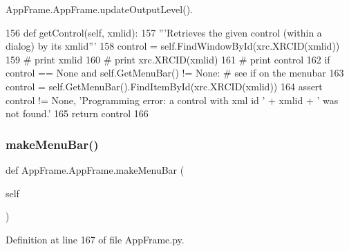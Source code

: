 App\+Frame.\+App\+Frame.\+update\+Output\+Level().


\begin{DoxyCode}
156     \textcolor{keyword}{def }getControl(self, xmlid):
157         \textcolor{stringliteral}{'''Retrieves the given control (within a dialog) by its xmlid'''}
158         control = self.FindWindowById(xrc.XRCID(xmlid))
159 \textcolor{comment}{#        print xmlid}
160 \textcolor{comment}{#        print xrc.XRCID(xmlid)}
161 \textcolor{comment}{#        print control}
162         \textcolor{keywordflow}{if} control == \textcolor{keywordtype}{None} \textcolor{keywordflow}{and} self.GetMenuBar() != \textcolor{keywordtype}{None}:  \textcolor{comment}{# see if on the menubar}
163             control = self.GetMenuBar().FindItemById(xrc.XRCID(xmlid))
164         \textcolor{keyword}{assert} control != \textcolor{keywordtype}{None}, \textcolor{stringliteral}{'Programming error: a control with xml id '} + xmlid + \textcolor{stringliteral}{' was not found.'}
165         \textcolor{keywordflow}{return} control
166     
\end{DoxyCode}
\mbox{\label{classAppFrame_1_1AppFrame_a39ad7daf6cc1af75dc9ac03aa19a055c}} 
\subsubsection{\texorpdfstring{make\+Menu\+Bar()}{makeMenuBar()}}
{\footnotesize\ttfamily def App\+Frame.\+App\+Frame.\+make\+Menu\+Bar (\begin{DoxyParamCaption}\item[{}]{self }\end{DoxyParamCaption})}



Definition at line 167 of file App\+Frame.\+py.


